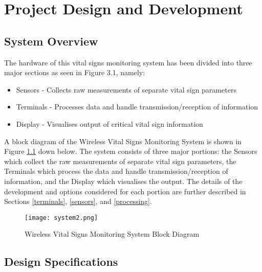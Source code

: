 \chapter{Project Design and Development}


\section{System Overview}

The hardware of this vital signs monitoring system has been divided into three major sections as seen in Figure 3.1, namely: 

\begin{itemize}
	\item Sensors - Collects raw measurements of separate vital sign parameters 
	\item Terminals - Processes data and handle transmission/reception of information
	\item Display - Visualises output of critical vital sign information
\end{itemize}

A block diagram of the Wireless Vital Signs Monitoring System is shown in Figure \ref{system} down below. The system consists of three major portions: the Sensors which collect the raw measurements of separate vital sign parameters, the Terminals which process the data and handle transmission/reception of information, and the Display which visualises the output. The details of the development and options considered for each portion are further described in Sections \ref{terminals}, \ref{sensors}, and \ref{processing}.

\begin{figure}[H]
	\centering
	\texttt{[image: system2.png]}
	\caption{Wireless Vital Signs Monitoring System Block Diagram}
	\label{system}
\end{figure}

\section{Design Specifications}
\label{specifications}
